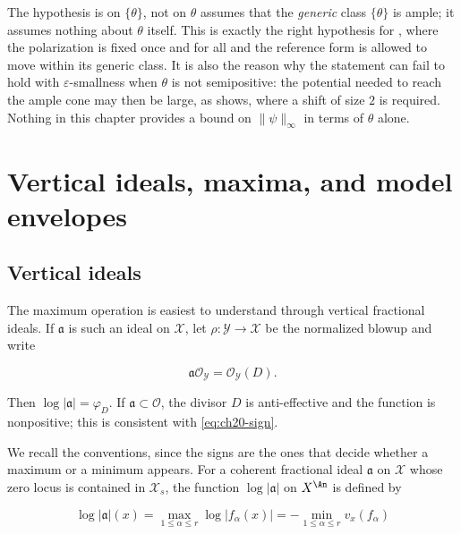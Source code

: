 \begin{warning}{The hypothesis is on \(\{\theta\}\), not on \(\theta\)}
 assumes that the \emph{generic}
class \(\{\theta\}\) is ample; it assumes nothing about \(\theta\) itself.
This is exactly the right hypothesis for , where the
polarization is fixed once and for all and the reference form is allowed to
move within its generic class.  It is also the reason why the statement can
fail to hold with \(\varepsilon\)-smallness when \(\theta\) is not
semipositive: the potential needed to reach the ample cone may then be
large, as  shows, where a shift
of size \(2\) is required.  Nothing in this chapter provides a bound on
\(\|\psi\|_\infty\) in terms of \(\theta\) alone.
\end{warning}

\section{Vertical ideals, maxima, and model envelopes}
\label{sec:ch20-max-envelopes}

\subsection{Vertical ideals}
\label{sec:ch20-vertical-ideals}

The maximum operation is easiest to understand through vertical fractional
ideals.  If \(\mathfrak a\) is such an ideal on \(\mathcal X\), let
\(\rho:\mathcal Y\to\mathcal X\) be the normalized blowup and write

\begin{equation}
\label{eq:ch20-ideal-divisor}
             \mathfrak a\mathcal O_{\mathcal Y}
                    =\mathcal O_{\mathcal Y}(D).
\end{equation}

Then \(\log|\mathfrak a|=\varphi_D\).  If \(\mathfrak a\subset\mathcal O\),
the divisor \(D\) is anti-effective and the function is nonpositive; this is
consistent with \eqref{eq:ch20-sign}.

We recall the conventions, since the signs are the ones that decide whether
a maximum or a minimum appears.  For a coherent fractional ideal
\(\mathfrak a\) on \(\mathcal X\) whose zero locus is contained in
\(\mathcal X_s\), the function \(\log|\mathfrak a|\) on \(X^{\An}\) is
defined by

\begin{equation}
\label{eq:ch20-log-ideal}
 \log|\mathfrak a|(x)=\max_{1\le\alpha\le r}\log|f_\alpha(x)|
 =-\min_{1\le\alpha\le r}v_x(f_\alpha)
\end{equation}

